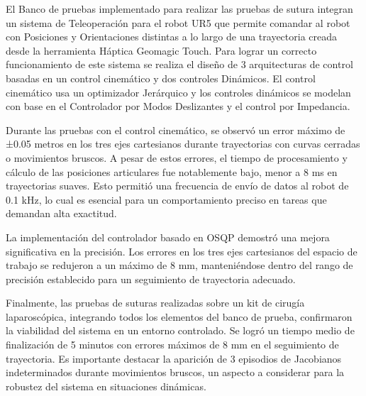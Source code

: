 El Banco de pruebas implementado para realizar las pruebas de sutura integran un sistema de Teleoperación para el robot UR5 que permite comandar al robot con Posiciones y Orientaciones distintas a lo largo de una trayectoria creada desde la herramienta Háptica Geomagic Touch. Para lograr un correcto funcionamiento de este sistema se realiza el diseño de 3 arquitecturas de control basadas en un control cinemático y dos controles Dinámicos. El control cinemático usa un optimizador Jerárquico y los controles dinámicos se modelan con base en el Controlador por Modos Deslizantes y el control por Impedancia.

Durante las pruebas con el control cinemático, se observó un error máximo de ±0.05 metros en los tres ejes cartesianos durante trayectorias con curvas cerradas o movimientos bruscos. A pesar de estos errores, el tiempo de procesamiento y cálculo de las posiciones articulares fue notablemente bajo, menor a 8 ms en trayectorias suaves. Esto permitió una frecuencia de envío de datos al robot de 0.1 kHz, lo cual es esencial para un comportamiento preciso en tareas que demandan alta exactitud.

La implementación del controlador basado en OSQP demostró una mejora significativa en la precisión. Los errores en los tres ejes cartesianos del espacio de trabajo se redujeron a un máximo de 8 mm, manteniéndose dentro del rango de precisión establecido para un seguimiento de trayectoria adecuado.



Finalmente, las pruebas de suturas realizadas sobre un kit de cirugía laparoscópica, integrando todos los elementos del banco de prueba, confirmaron la viabilidad del sistema en un entorno controlado. Se logró un tiempo medio de finalización de 5 minutos con errores máximos de 8 mm en el seguimiento de trayectoria. Es importante destacar la aparición de 3 episodios de Jacobianos indeterminados durante movimientos bruscos, un aspecto a considerar para la robustez del sistema en situaciones dinámicas.
